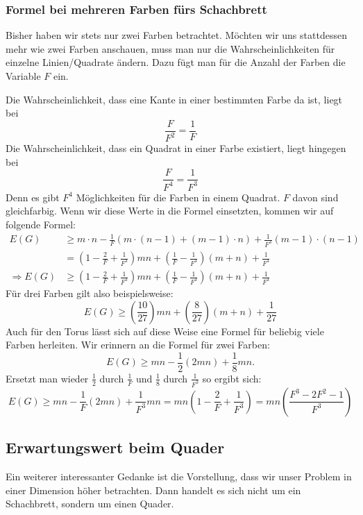 \documentclass[11pt,a4paper]{article}
\numberwithin{equation}{section}
\numberwithin{table}{section}
\numberwithin{figure}{section}
\begin{document}
\subsubsection{Formel bei mehreren Farben fürs Schachbrett}
Bisher haben wir stets nur zwei Farben betrachtet. Möchten wir uns stattdessen mehr wie zwei Farben anschauen, muss man nur die Wahrscheinlichkeiten für einzelne Linien/Quadrate ändern. Dazu fügt man für die Anzahl der Farben die Variable $F$ ein.\par\noindent
Die Wahrscheinlichkeit, dass eine Kante in einer bestimmten Farbe da ist, liegt bei $$\frac{F}{F^2}=\frac{1}{F}$$
Die Wahrscheinlichkeit, dass ein Quadrat in einer Farbe existiert, liegt hingegen bei
$$\frac{F}{F^4}=\frac{1}{F^3}$$
Denn es gibt $F^4$  Möglichkeiten für die Farben in einem Quadrat. $F$ davon sind gleichfarbig. 
Wenn wir diese Werte in die Formel einsetzten, kommen wir auf folgende Formel: 
\begin{align*}
E(G)&\geq m\cdot n-\frac{1}{F}(m\cdot(n-1)+(m-1)\cdot n)+\frac{1}{F^3}(m-1)\cdot(n-1)\\
&=\left(1-\frac{2}{F}+\frac{1}{F^3}\right)mn+\left(\frac{1}{F}-\frac{1}{F^3}\right)(m+n)+\frac{1}{F^3}\\
\Rightarrow E(G)&\geq\left(1-\frac{2}{F}+\frac{1}{F^3}\right)mn+\left(\frac{1}{F}-\frac{1}{F^3}\right)(m+n)+\frac{1}{F^3}
\end{align*}
Für drei Farben gilt also beispielsweise:
$$E(G)\geq\left(\frac{10}{27} \right)mn+\left(\frac{8}{27}\right)(m+n)+\frac{1}{27}$$
Auch für den Torus lässt sich auf diese Weise eine Formel für beliebig viele Farben herleiten. Wir erinnern an die Formel für zwei Farben:
$$E(G)\geq mn-\frac{1}{2}(2mn)+\frac{1}{8}mn.$$
Ersetzt man wieder $\frac{1}{2}$ durch $\frac{1}{F}$ und $\frac{1}{8}$ durch $\frac{1}{F^3}$ so ergibt sich:
$$E(G) \geq mn-\frac{1}{F}(2mn)+\frac{1}{F^3}mn=mn\left(1-\frac{2}{F}+\frac{1}{F^3}\right)=mn\left(\frac{F^3-2F^2-1}{F^3}\right)$$
\subsection{Erwartungswert beim Quader}

Ein weiterer interessanter Gedanke ist die Vorstellung, dass wir unser Problem in einer Dimension höher betrachten. Dann handelt es sich nicht um ein Schachbrett, sondern um einen Quader.
\end{document}
